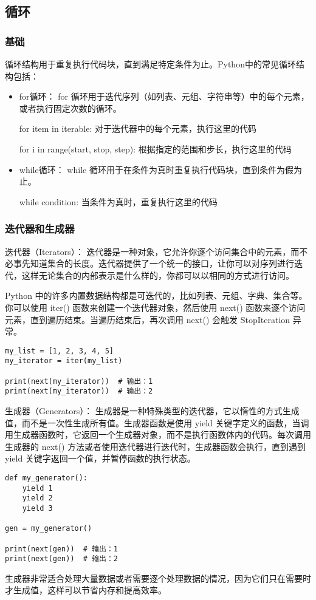 \documentclass{article}
\begin{document}
 \subsection{循环}
\subsubsection{基础}
循环结构用于重复执行代码块，直到满足特定条件为止。Python中的常见循环结构包括：
\begin{itemize}
    \item for循环： for 循环用于迭代序列（如列表、元组、字符串等）中的每个元素，或者执行固定次数的循环。
\par for item in iterable:
    对于迭代器中的每个元素，执行这里的代码

\par for i in range(start, stop, step):
    根据指定的范围和步长，执行这里的代码
    \item while循环： while 循环用于在条件为真时重复执行代码块，直到条件为假为止。
\par while condition:
    当条件为真时，重复执行这里的代码
\end{itemize}

\subsubsection{迭代器和生成器}
迭代器（Iterators）：
迭代器是一种对象，它允许你逐个访问集合中的元素，而不必事先知道集合的长度。迭代器提供了一个统一的接口，让你可以对序列进行迭代，这样无论集合的内部表示是什么样的，你都可以以相同的方式进行访问。

Python 中的许多内置数据结构都是可迭代的，比如列表、元组、字典、集合等。你可以使用 iter() 函数来创建一个迭代器对象，然后使用 next() 函数来逐个访问元素，直到遍历结束。当遍历结束后，再次调用 next() 会触发 StopIteration 异常。
\begin{lstlisting}[caption={示例Python代码}]
my_list = [1, 2, 3, 4, 5]
my_iterator = iter(my_list)

print(next(my_iterator))  # 输出：1
print(next(my_iterator))  # 输出：2
\end{lstlisting}
生成器（Generators）：
生成器是一种特殊类型的迭代器，它以惰性的方式生成值，而不是一次性生成所有值。生成器函数是使用 yield 关键字定义的函数，当调用生成器函数时，它返回一个生成器对象，而不是执行函数体内的代码。每次调用生成器的 next() 方法或者使用迭代器进行迭代时，生成器函数会执行，直到遇到 yield 关键字返回一个值，并暂停函数的执行状态。
\begin{lstlisting}[caption={示例Python代码}]
def my_generator():
    yield 1
    yield 2
    yield 3

gen = my_generator()

print(next(gen))  # 输出：1
print(next(gen))  # 输出：2
\end{lstlisting}
生成器非常适合处理大量数据或者需要逐个处理数据的情况，因为它们只在需要时才生成值，这样可以节省内存和提高效率。
\end{document}

